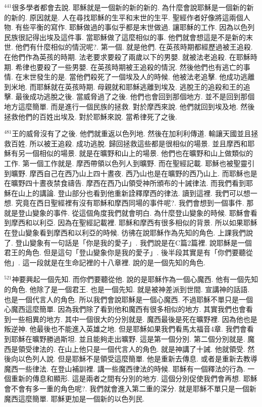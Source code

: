 \documentclass{book}
\begin{document}
$^{441}$很多學者都會去說.
耶穌就是一個新的新的新的.
為什麼會說耶穌是一個新的新的新的.
原因就是.
人在尋找耶穌的生平和末世的生平.
聖經作者好像將這兩個人物.
有些平衡的寫作.
耶穌做過的事似乎都是末世做過.
讓耶穌的工作.
因為以色列民族很記得出埃及這件事.
當耶穌做了這麼相似的事.
他們就會想這是不是新的末世.
他們有什麼相似的情況呢?.
第一個.
就是他們.
在英孩時期都經歷過被王追殺.
在他們作為英孩的時期.
法老要求要殺了兩歲以下的男嬰.
就被法老追殺.
在耶穌時期.
希律也要殺了一些男嬰.
在英孩時期被王追殺的情況.
然後他們也有逃亡的事情.
在末世發生的是.
當他們殺死了一個埃及人的時候.
他被法老追擊.
他成功逃離到米地.
而耶穌就在英孩時期.
母親就和耶穌逃離到埃及.
逃脫王的追殺和王的追擊.
最後成功逃脫之後.
當威脅過了之後.
他們也會回到那個地方.
並不是回到那個地方這麼簡單.
而是進行一個民族的拯救.
對於摩西來說.
他們就回到埃及地.
然後拯救他們的百姓出埃及.
對於耶穌來說.
當希律死了之後.

$^{481}$王的威脅沒有了之後.
他們就重返以色列地.
然後在加利利傳道.
輸讓天國並且拯救百姓.
所以被王追殺.
成功逃脫.
歸回拯救這些都是很相似的場景.
並且摩西和耶穌有另一個相似的場景.
就是在曠野和山上的場景.
他們也在曠野和山上做類似的工作.
第一個工作就是.
摩西帶領以色列人到曠野.
而在聖經記載.
耶穌也被聖靈引到曠野.
摩西自己在西乃山上四十晝夜.
西乃山也是在曠野的西乃山上.
而耶穌也是在曠野四十晝夜禁食禱告.
摩西在西乃山領受神所頒布的十誡律法.
而我們看到耶穌在山上的講論.
登山部分也看到他重新詮釋摩西的律法.
讀到這裡.
我們可以想一想.
究竟在西日聖經裡有沒有耶穌和摩西同場的事件呢?.
我們會想到一個事件.
那就是登山變象的事件.
從這個角度我們就會明白.
為什麼登山變象的時候.
耶穌會看到摩西和以利亞.
因為在聖經記載裡.
耶穌和摩西有很多相似的背景.
所以如果耶穌在登山變象看到摩西和以利亞的時候.
彷彿在說耶穌作為先知的角色.
上課我們說了.
登山變象有一句話是「你是我的愛子」.
我們說是在C篇2篇裡.
說耶穌是一個君王的角色.
但是這句「登山變象你是我的愛子」.
後半段其實是有「你們要聽從他」.
這一段就是在生命記裡的十八章裡.
說的是一個先知的角色.

$^{521}$神要興起一個先知.
而你們要聽從他.
說的是耶穌作為一個心魔西.
他有一個先知的角色.
他除了是一個君王.
也是一個先知.
就是被神差派到世間.
宣講神的話語.
也是一個代言人的角色.
所以我們會說耶穌是一個心魔西.
不過耶穌不單只是一個心魔西這麼簡單.
因為我們除了看到他和魔西有很多相似的地方.
其實我們也會看到一些相異的地方.
其中一個很大的分別就是.
魔西最後是死在曠野裡.
因為他也是叛逆神.
他最後也不能進入英雄之地.
但是耶穌如果我們看馬太福音4章.
我們會看到耶穌在曠野勝過斯坦.
並且能夠走出曠野.
這是第一個分別.
第二個分別就是.
魔西是領受律法的.
在山上他只是一個代言人的角色.
就是神講了十誡.
他就領受.
然後向以色列人說.
但是耶穌不是領受這麼簡單.
他是重新去傳息.
或者是重新去教導魔西一些律法.
在登山補訓裡.
講一些魔西律法的時候.
耶穌有一個釋法的行為.
一個重新的傳息和顯形.
這是兩者之間有分別的地方.
這個分別促使我們會再想.
耶穌會不會有多一重的角色呢?.
我們就會進入第二重的深分.
就是耶穌不單只是一個新魔西這麼簡單.
耶穌更加是一個新的以色列民.
\end{document}
